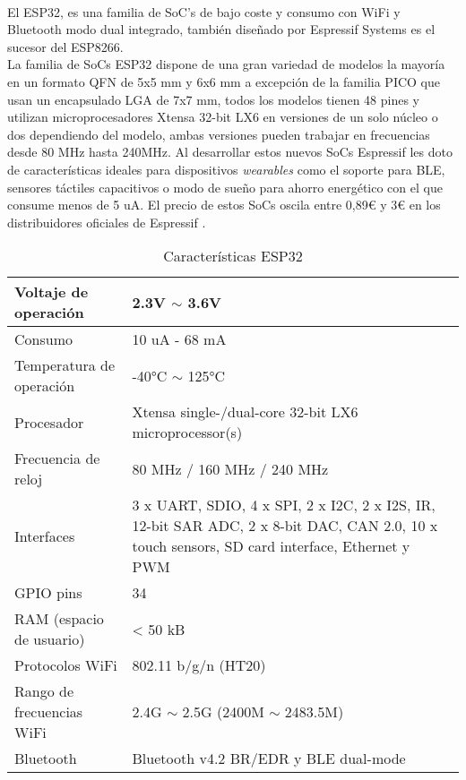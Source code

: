 \documentclass[../proyecto.tex]{subfiles}
\begin{document}
\\

El ESP32, es una familia de SoC's de bajo coste y consumo con WiFi y Bluetooth modo dual integrado, también diseñado por Espressif Systems \cite{esp32_overview} es el sucesor del ESP8266.\\

La familia de SoCs ESP32 dispone de una gran variedad de modelos la mayoría en un formato QFN de 5x5 mm y 6x6 mm a excepción de la familia PICO que usan un encapsulado LGA de 7x7 mm, todos los modelos tienen 48 pines y utilizan microprocesadores Xtensa 32-bit LX6 en versiones de un solo núcleo o dos dependiendo del modelo, ambas versiones pueden trabajar en frecuencias desde 80 MHz hasta 240MHz. Al desarrollar estos nuevos SoCs Espressif les doto de características ideales para dispositivos \textit{wearables} como el soporte para BLE, sensores táctiles capacitivos o modo de sueño para ahorro energético con el que consume menos de 5  uA. El precio de estos SoCs oscila entre 0,89€ y 3€ en los distribuidores oficiales de Espressif \cite{espressif_provider_digikey} \cite{espressif_provider_mouser}.\\

\begin{table}[H]
\centering
\begin{tabular}{ |l|m{20em}| }
\hline
Voltaje de operación      & 2.3V $\sim$ 3.6V          \\ \hline
Consumo                   & 10 uA - 68 mA  \\ \hline
Temperatura de operación  & -40°C $\sim$ 125°C        \\ \hline
Procesador                & Xtensa single-/dual-core 32-bit LX6 microprocessor(s)   \\ \hline
Frecuencia de reloj       & 80 MHz / 160 MHz  / 240 MHz        \\ \hline
Interfaces                & 3 x UART, SDIO, 4 x SPI, 2 x I2C, 2 x I2S, IR, 12-bit SAR ADC, 2 x 8-bit DAC, CAN 2.0, 10 x touch sensors, SD card interface, Ethernet y PWM                           \\ \hline
GPIO pins                 & 34                        \\ \hline
RAM (espacio de usuario)  & < 50 kB                     \\ \hline
Protocolos WiFi           & 802.11 b/g/n (HT20)       \\ \hline
Rango de frecuencias WiFi & 2.4G $\sim$ 2.5G (2400M $\sim$ 2483.5M) \\ \hline
Bluetooth           &  Bluetooth v4.2 BR/EDR y BLE dual-mode  \\ \hline
\end{tabular}
\caption{Características ESP32}
\label{table:caracteristicas_esp32}
\end{table}
\end{document}
